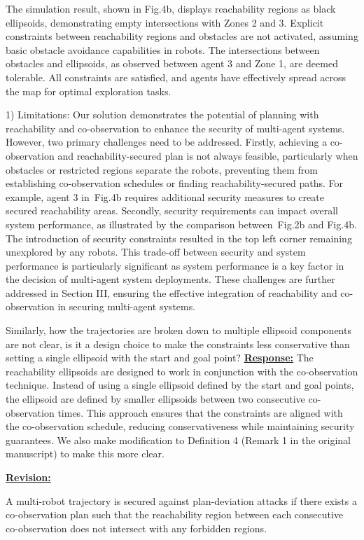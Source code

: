 \documentclass{article}
\newcommand{\re}{\tcblower \underline{\textbf{Response:}}\quad}
\newcommand{\rv}{{\large{\underline{\textbf{Revision:}}}}\quad}
\newcommand{\news}{\color{blue}}
\begin{document}
The simulation result, shown in Fig.4b, displays reachability regions as black ellipsoids, demonstrating empty intersections with Zones 2 and 3. Explicit constraints between reachability regions and obstacles are not activated, assuming basic obstacle avoidance capabilities in robots. The intersections between obstacles and ellipsoids, as observed between agent 3 and Zone 1, are deemed tolerable. All constraints are satisfied, and agents have effectively spread across the map for optimal exploration tasks.

1) Limitations:
Our solution demonstrates the potential of planning with reachability and co-observation to enhance the security of multi-agent systems. {\news However, two primary challenges need to be addressed. Firstly, achieving a co-observation and reachability-secured plan is not always feasible, particularly when obstacles or restricted regions separate the robots, preventing them from establishing co-observation schedules or finding reachability-secured paths. For example, agent 3 in~Fig.4b requires additional security measures to create secured reachability areas. Secondly, security requirements can impact overall system performance, as illustrated by the comparison between~Fig.2b and Fig.4b. The introduction of security constraints resulted in the top left corner remaining unexplored by any robots. This trade-off between security and system performance is particularly significant as system performance is a key factor in the decision of multi-agent system deployments. These challenges are further addressed in Section III, ensuring the effective integration of reachability and co-observation in securing multi-agent systems.}

\vspace{0.3cm}

\begin{cmt}{}{}
	Similarly, how the
	trajectories are broken down to multiple ellipsoid components are not
	clear, is it a design choice to make the constraints less conservative
	than setting a single ellipsoid with the start and goal point?
	\re 
	The reachability ellipsoids are designed to work in conjunction with the co-observation technique. Instead of using a single ellipsoid defined by the start and goal points, the ellipsoid are defined by smaller ellipsoids between two consecutive co-observation times. This approach ensures that the constraints are aligned with the co-observation schedule, reducing conservativeness while maintaining security guarantees. We also make modification to Definition 4 (Remark 1 in the original manuscript) to make this more clear.
\end{cmt}
\rv
{\news \setcounter{definition}{3}
 \begin{definition}\label{rmk:revised-security}
	A multi-robot trajectory is secured against plan-deviation attacks if there exists a co-observation plan such that the reachability region between each consecutive co-observation does not intersect with any forbidden regions.
\end{definition}}
\end{document}
